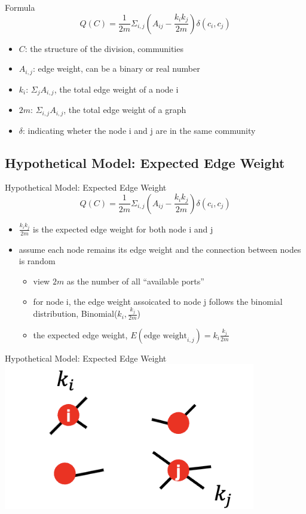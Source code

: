 \documentclass[12pt]{beamer}
\begin{document}
\begin{frame}{Formula}
$$
Q(C) = \frac{1}{2m}\Sigma_{i, j} (A_{ij}-\frac{k_ik_j}{2m})\delta(c_i, c_j)
$$
\begin{itemize}
    \item $C$: the structure of the division, communities
    \item $A_{i, j}$: edge weight, can be a binary or real number
    \item $k_i$: $\Sigma_j A_{i, j}$, the total edge weight of a node i
    \item $2m$: $\Sigma_{i, j}A_{i, j}$, the total edge weight of a graph
    \item $\delta$: indicating wheter the node i and j are in the same community
\end{itemize}
\end{frame}


\subsection{Hypothetical Model: Expected Edge Weight}
\begin{frame}{Hypothetical Model: Expected Edge Weight}
$$
Q(C) = \frac{1}{2m}\Sigma_{i, j} (A_{ij}-\frac{k_ik_j}{2m})\delta(c_i, c_j)
$$
\begin{itemize}
    \item  $\frac{k_ik_j}{2m}$ is the expected edge weight for both node i and j
    \item assume each node remains its edge weight and the connection between nodes is random

    \begin{itemize}
            \item view $2m$ as the number of all “available ports”
            \item for node i, the edge weight assoicated to node j follows
                the binomial distribution, Binomial($k_i, \frac{k_j}{2m}$)
            \item the expected edge weight,
                $E(\text{edge weight}_{i, j}) = k_i\frac{k_j}{2m}$
    \end{itemize}
\end{itemize}
\end{frame}


\begin{frame}{Hypothetical Model: Expected Edge Weight}
\centering
\includegraphics[width=11cm]{img/img2.png}
\end{frame}
\end{document}
